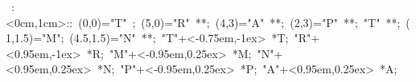 

\hbox{
\xy    <1cm,0cm>:<0cm,1cm>::
       (0,0)="T" ; (5,0)="R" **\dir{-}; 
       (4,3)="A" **\dir{-};  (2,3)="P" **\dir{-}; "T" **\dir{-};
       (1,1.5)="M"; (4.5,1.5)="N" **\dir{-};
       "T"+<-0.75em,-1ex> *{T};
       "R"+<0.95em,-1ex> *{R};
       "M"+<-0.95em,0.25ex> *{M};
       "N"+<0.95em,0.25ex> *{N};
       "P"+<-0.95em,0.25ex> *{P};
       "A"+<0.95em,0.25ex> *{A};
\endxy}
	   
